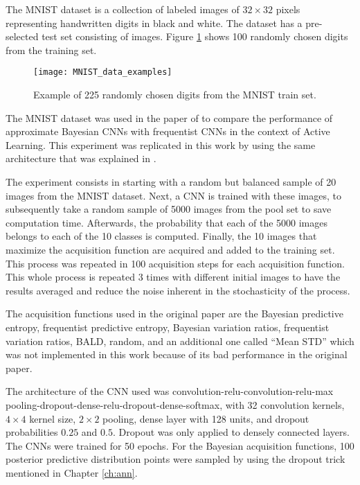 The MNIST dataset is a collection of  labeled images of $32 \times 32$ pixels representing handwritten digits in black and white. The dataset has a pre-selected test set consisting of  images. Figure \ref{fig:MNIST_data_examples} shows 100 randomly chosen digits from the training set.

\begin{figure}[H]
    \centering
    \texttt{[image: MNIST\_data\_examples]}
    \caption{Example of 225 randomly chosen digits from the MNIST train set.}
    \label{fig:MNIST_data_examples}
\end{figure}

The MNIST dataset was used in the paper of \citeauthor{Gal2016Active} to compare the performance of approximate Bayesian CNNs with frequentist CNNs in the context of Active Learning. This experiment was replicated in this work by using the same architecture that was explained in \cite{Gal2016Active}.

The experiment consists in starting with a random but balanced sample of 20 images from the MNIST dataset. Next, a CNN is trained with these images, to subsequently take a random sample of 5000 images from the pool set to save computation time. Afterwards, the probability that each of the 5000 images belongs to each of the 10 classes is computed. Finally, the 10 images that maximize the acquisition function are acquired and added to the training set. This process was repeated in 100 acquisition steps for each acquisition function. This whole process is repeated 3 times with different initial images to have the results averaged and reduce the noise inherent in the stochasticity of the process.

The acquisition functions used in the original paper are the Bayesian predictive entropy, frequentist predictive entropy, Bayesian variation ratios, frequentist variation ratios, BALD, random, and an additional one called ``Mean STD'' which was not implemented in this work because of its bad performance in the original paper.

The architecture of the CNN used was convolution-relu-convolution-relu-max pooling-dropout-dense-relu-dropout-dense-softmax, with 32 convolution kernels, $4 \times 4$ kernel size, $2 \times 2$ pooling, dense layer with 128 units, and dropout probabilities $0.25$ and $0.5$. Dropout was only applied to densely connected layers. The CNNs were trained for 50 epochs. For the Bayesian acquisition functions, 100 posterior predictive distribution points were sampled by using the dropout trick mentioned in Chapter \ref{ch:ann}.

